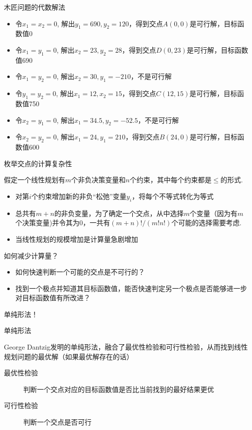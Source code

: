 \documentclass[mathserif, table]{beamer}
\begin{document}
\begin{frame}{木匠问题的代数解法}
  \begin{itemize}
  \item 令$x_1 = x_2 = 0$, 解出$y_1 = 690, y_2 = 120$，得到交点$A(0,0)$是可行解，目标函数值0
  \item 令$x_1 = y_1 = 0$, 解出$x_2 = 23, y_2 = 28$，得到交点$D(0,23)$是可行解，目标函数值690
  \item 令$x_1 = y_2 = 0$, 解出$x_2 = 30, y_1 = -210$，不是可行解
  \item 令$y_1 = y_2 = 0$, 解出$x_1 = 12, x_2 = 15$，得到交点$C(12,15)$是可行解，目标函数值750
  \item 令$x_2 = y_1 = 0$, 解出$x_1 = 34.5, y_2 = -52.5$，不是可行解
  \item 令$x_2 = y_2 = 0$, 解出$x_1 = 24, y_1 = 210$，得到交点$B(24,0)$是可行解，目标函数值600
  \end{itemize}
  
\end{frame}

\begin{frame}{枚举交点的计算复杂性}

  假定一个线性规划有$m$个非负决策变量和$n$个约束，其中每个约束都是$\le$的形式.
  \begin{itemize}
  \item 对第$i$个约束增加新的非负``松弛''变量$y_i$，将每个不等式转化为等式
  \item 总共有$m+n$的非负变量，为了确定一个交点，从中选择$m$个变量（因为有$m$个决策变量)并令其为0，一共有$(m+n)!/(m!n!)$个可能的选择需要考虑.
  \item 当线性规划的规模增加是计算量急剧增加
  \end{itemize}
  
\end{frame}

\begin{frame}{如何减少计算量？}

  \begin{itemize}
  \item 如何快速判断一个可能的交点是不可行的？
  \item 找到一个极点并知道其目标函数值，能否快速判定另一个极点是否能够进一步对目标函数值有所改进？
  \end{itemize}

  单纯形法！
  
\end{frame}

\begin{frame}{单纯形法}
  \begin{block}{}
    George Dantzig发明的单纯形法，融合了最优性检验和可行性检验，从而找到线性规划问题的最优解（如果最优解存在的话）
  \end{block}

  \begin{description}
  \item[最优性检验] 判断一个交点对应的目标函数值是否比当前找到的最好结果更优
  \item[可行性检验] 判断一个交点是否可行
  \end{description}

\end{frame}
\end{document}
